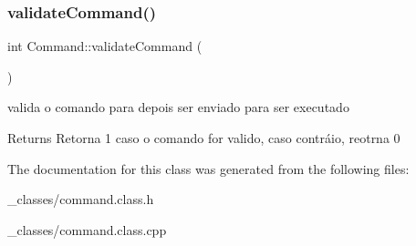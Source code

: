 \subsubsection{\texorpdfstring{validate\+Command()}{validateCommand()}}
{\footnotesize\ttfamily int Command\+::validate\+Command (\begin{DoxyParamCaption}{ }\end{DoxyParamCaption})}



valida o comando para depois ser enviado para ser executado 

\begin{DoxyReturn}{Returns}
Retorna 1 caso o comando for valido, caso contráio, reotrna 0 
\end{DoxyReturn}


The documentation for this class was generated from the following files\+:\begin{DoxyCompactItemize}
\item 
\+\_\+classes/command.\+class.\+h\item 
\+\_\+classes/command.\+class.\+cpp\end{DoxyCompactItemize}
